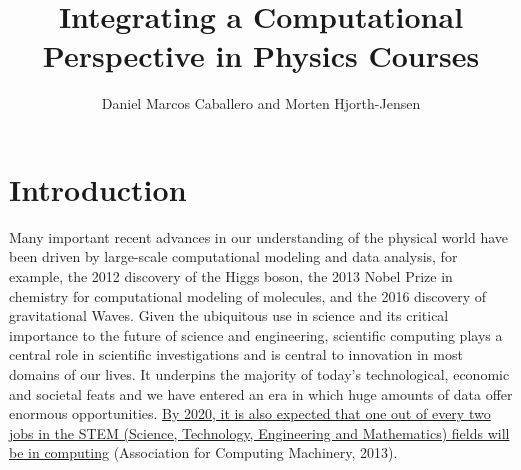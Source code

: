 \documentclass[graybox,envcountchap,sectrefs]{svmult}
\begin{document}
\title{Integrating a Computational Perspective in Physics Courses}
\author{Daniel Marcos Caballero and Morten Hjorth-Jensen}


\maketitle


\section{Introduction}

Many important recent advances in our understanding of the physical
world have been driven by large-scale computational modeling and data
analysis, for example, the 2012 discovery of the Higgs boson, the 2013
Nobel Prize in chemistry for computational modeling of molecules, and
the 2016 discovery of gravitational Waves.  Given the ubiquitous use
in science and its critical importance to the future of science and
engineering, scientific computing plays a central role in scientific
investigations and is central to innovation in most domains of our
lives. It underpins the majority of today's technological, economic
and societal feats and we have entered an era in which huge amounts of
data offer enormous opportunities. \href{{http://pathways.acm.org/executive-summary.html}}{By 2020, it is also expected that one out of every two
jobs in the STEM (Science, Technology, Engineering and Mathematics) fields will be in
computing}
(Association for Computing Machinery, 2013).
\end{document}
